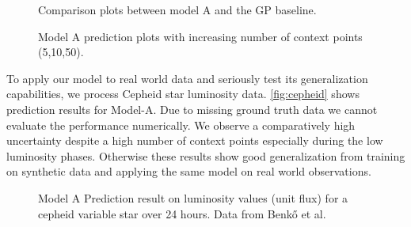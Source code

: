 	\begin{figure}
	\centering
	\resizebox{0.5\textwidth}{!}{
		
	}
\caption{Comparison plots between model A and the GP baseline.}
\label{fig:gp_comp}
\end{figure}

	\begin{figure*}
	\centering
	\resizebox{0.9\textwidth}{!}{
		
		
		
	}
\caption{Model A prediction plots with increasing number of context points (5,10,50).}
\label{fig:result_plot}
\end{figure*}

To apply our model to real world data and seriously test its generalization capabilities, we process Cepheid star luminosity data. \autoref{fig:cepheid} shows prediction results for Model-A. Due to missing ground truth data we cannot evaluate the performance numerically. We observe a comparatively high uncertainty despite a high number of context points especially during the low luminosity phases. Otherwise these results show good generalization from training on synthetic data and applying the same model on real world observations.

\begin{figure}
	\centering
	\resizebox{0.4\textwidth}{!}{
		
	}
\caption{Model A Prediction result on luminosity values (unit flux) for a cepheid variable star over 24 hours. Data from Benkő et al. \cite{Benk__2014}}
\label{fig:cepheid}
\end{figure}